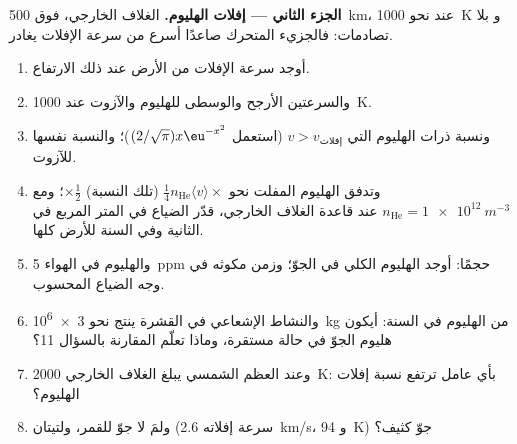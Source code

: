 \begin{problem}
\textbf{الجزء الثاني --- إفلات الهليوم.}
الغلاف الخارجي، فوق \qty{500}{km}، عند نحو \qty{1000}{K} و
بلا تصادمات: فالجزيء المتحرك صاعدًا أسرع من سرعة الإفلات
يغادر.
\begin{enumerate}[resume]
  \item أوجد سرعة الإفلات من الأرض عند ذلك الارتفاع.
  \item والسرعتين الأرجح والوسطى للهليوم والآزوت عند
        \qty{1000}{K}.
  \item ونسبة ذرات الهليوم التي $v > v_{\text{إفلات}}$ (استعمل
        $(2/\sqrt\pi)x\eu^{-x^2}$)؛ والنسبة نفسها للآزوت.
  \item وتدفق الهليوم المفلت نحو $\tfrac14n_{\text{He}}\langle
        v\rangle \times$ (تلك النسبة) $\times\tfrac12$؛ ومع $n_{\text{He}}
        = \qty{1e12}{m^{-3}}$ عند قاعدة الغلاف الخارجي، قدّر الضياع في المتر
        المربع في الثانية وفي السنة للأرض كلها.
  \item والهليوم في الهواء \qty{5}{ppm} حجمًا: أوجد الهليوم الكلي في
        الجوّ؛ وزمن مكوثه في وجه الضياع المحسوب.
  \item والنشاط الإشعاعي في القشرة ينتج نحو \qty{3e6}{kg} من الهليوم
        في السنة: أيكون هليوم الجوّ في حالة مستقرة، وماذا
        تعلّم المقارنة بالسؤال 11؟
  \item وعند العظم الشمسي يبلغ الغلاف الخارجي \qty{2000}{K}: بأي
        عامل ترتفع نسبة إفلات الهليوم؟
  \item ولمَ لا جوّ للقمر، ولتيتان (سرعة إفلاته
        \qty{2.6}{km/s}، و \qty{94}{K}) جوّ كثيف؟
\end{enumerate}


\end{problem}
